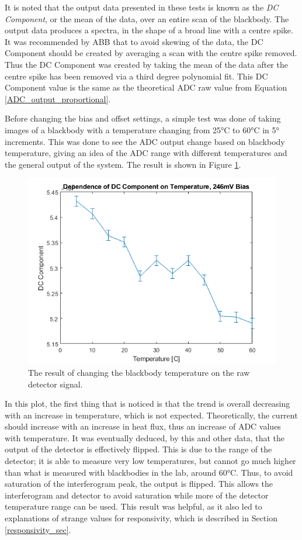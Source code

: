 It is noted that the output data presented in these tests is known as the \textit{DC Component}, or the mean of the data, over an entire scan of the blackbody. The output data produces a spectra, in the shape of a broad line with a centre spike. It was recommended by ABB that to avoid skewing of the data, the DC Component should be created by averaging a scan with the centre spike removed. Thus the DC Component was created by taking the mean of the data after the centre spike has been removed via a third degree polynomial fit. This DC Component value is the same as the theoretical ADC raw value from Equation \ref{ADC_output_proportional}.

Before changing the bias and offset settings, a simple test was done of taking images of a blackbody with a temperature changing from 25°C to 60°C in 5° increments. This was done to see the ADC output change based on blackbody temperature, giving an idea of the ADC range with different temperatures and the general output of the system. The result is shown in Figure \ref{fig:ADC_dep_on_bb_temp}.

\begin{figure}[h]
  \centering
  \includegraphics[width=0.8\linewidth]{chap5_images/DC_dep_on_temp.png}
  \caption{The result of changing the blackbody temperature on the raw detector signal.}
  \label{fig:ADC_dep_on_bb_temp}
\end{figure}

In this plot, the first thing that is noticed is that the trend is overall decreasing with an increase in temperature, which is not expected. Theoretically, the current should increase with an increase in heat flux, thus an increase of ADC values with temperature. It was eventually deduced, by this and other data, that the output of the detector is effectively flipped. This is due to the range of the detector; it is able to measure very low temperatures, but cannot go much higher than what is measured with blackbodies in the lab, around 60°C. Thus, to avoid saturation of the interferogram peak, the output is flipped. This allows the interferogram and detector to avoid saturation while more of the detector temperature range can be used. This result was helpful, as it also led to explanations of strange values for responsivity, which is described in Section \ref{responsivity_sec}.

